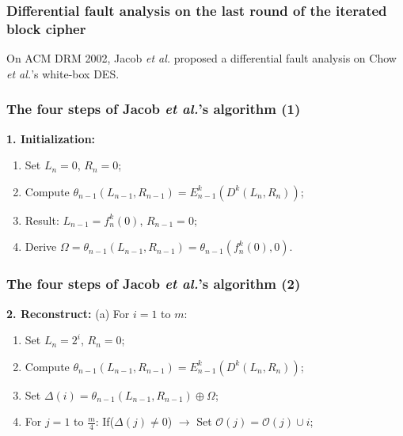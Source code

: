 \documentclass{beamer}
\begin{document}
\frame
{
\frametitle{Differential fault analysis on the last round of the iterated block cipher}
On ACM DRM 2002, Jacob \textit{et al.} proposed a differential fault analysis on Chow \textit{et al.}'s white-box DES.
\begin{center}

\end{center}
}

\frame
{
\frametitle{The four steps of Jacob \textit{et al.}'s algorithm (1)}
\textbf{1. Initialization:}
\begin{enumerate}[1)]
\item Set $L_{n}=0$, $R_{n}=0$;
\item Compute $\theta_{n-1}(L_{n-1}, R_{n-1})=E^{k}_{n-1}(D^{k}(L_{n}, R_{n}))$;
\item Result: $L_{n-1}=f^{k}_{n}(0)$, $R_{n-1}=0$;
\item Derive $\Omega=\theta_{n-1}(L_{n-1}, R_{n-1})=\theta_{n-1}(f^{k}_{n}(0),0)$.
\end{enumerate}
}

\frame
{
\frametitle{The four steps of Jacob \textit{et al.}'s algorithm (2)}
\textbf{2. Reconstruct:}
(a) For $i=1$ to $m$:

\begin{enumerate}[1)]
\item Set $L_{n}=2^{i}$, $R_{n}=0$;
\item Compute $\theta_{n-1}(L_{n-1}, R_{n-1})=E^{k}_{n-1}(D^{k}(L_{n}, R_{n}))$;
\item Set $\Delta(i)=\theta_{n-1}(L_{n-1}, R_{n-1}) \oplus \Omega$;
\item For $j=1$ to $\frac{m}{4}$: If($\Delta(j) \neq 0$) $\rightarrow$ Set $\mathcal{O}(j)=\mathcal{O}(j) \cup {i}$;
\end{enumerate}

}
\end{document}
